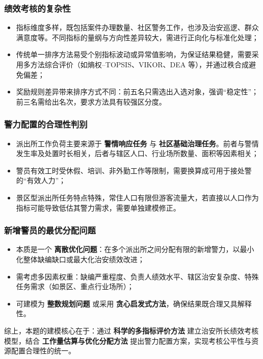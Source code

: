\documentclass[12pt]{ctexart}
\begin{document}
	\subsubsection{绩效考核的复杂性}
	\begin{itemize}
		\item 指标维度多样，既包括案件办理数量、社区警务工作，也涉及治安巡逻、群众满意度等。不同指标的量纲与方向性差异较大，需进行正向化与标准化处理；
		\item 传统单一排序方法易受个别指标波动或异常值影响，为保证结果稳健，需要采用多方法综合评价（如熵权--TOPSIS、VIKOR、DEA 等），并通过秩合成避免偏差；
		\item 奖励规则差异带来排序方式不同：前五名只需选出入选对象，强调“稳定性”；前三名需给出名次，要求方法具有较强区分度。
	\end{itemize}
	
	\subsubsection{警力配置的合理性判别}
	\begin{itemize}
		\item 派出所工作负荷主要来源于 \textbf{警情响应任务} 与 \textbf{社区基础治理任务}。前者与警情发生率及处置时长相关，后者与辖区人口、行业场所数量、面积等因素相关；
		\item 警员有效工时受休假、培训、非外勤工作等限制，需要换算成可用于接处警的“有效人力”；
		\item 景区型派出所任务特点特殊，常住人口有限但游客流量大，若直接以人口作为指标可能导致低估其警力需求，需要单独建模修正。
	\end{itemize}
	
	\subsubsection{新增警员的最优分配问题}
	\begin{itemize}
		\item 本质是一个 \textbf{离散优化问题}：在多个派出所之间分配有限的新增警力，以最小化整体缺编缺口或最大化治安绩效改进；
		\item 需考虑多因素权重：缺编严重程度、负责人绩效水平、辖区治安复杂度、特殊任务需求（如景区、重点行业场所）；
		\item 可建模为 \textbf{整数规划问题} 或采用 \textbf{贪心启发式方法}，确保结果既合理又具解释性。
	\end{itemize}
	
	综上，本题的建模核心在于：通过 \textbf{科学的多指标评价方法} 建立治安所长绩效考核模型，结合 \textbf{工作量估算与优化分配方法} 提出警力配置方案，实现考核公平性与资源配置合理性的统一。
	
\end{document}

